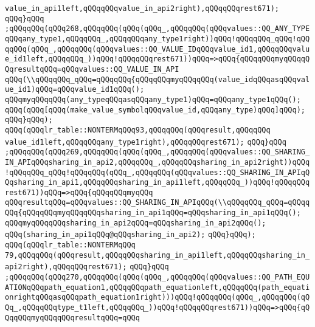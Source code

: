 \verb|value_in_api1left,qQQqqQQqvalue_in_api2right),qQQqqQQqrest671);|\newline
\verb|qQQq}qQQq|\newline
\verb|;qQQqqQQq(qQQq268,qQQqqQQq(qQQq(qQQq_,qQQqqQQq(qQQqvalues::QQ_ANY_TYPEqQQqany_type1,qQQqqQQq_,qQQqqQQqany_type1right))qQQq!qQQqqQQq_qQQq!qQQqqQQq(qQQq_,qQQqqQQq(qQQqvalues::QQ_VALUE_IDqQQqvalue_id1,qQQqqQQqvalue_id1left,qQQqqQQq_))qQQq!qQQqqQQqrest671))qQQq=>qQQq{qQQqqQQqmyqQQqqQQqresultqQQq=qQQqvalues::QQ_VALUE_IN_API|\newline
\verb|qQQq(\\qQQqqQQq_qQQq=qQQqqQQq{qQQqqQQqmyqQQqqQQq(value_idqQQqasqQQqvalue_id1)qQQq=qQQqvalue_id1qQQq();|\newline
\verb|qQQqmyqQQqqQQq(any_typeqQQqasqQQqany_type1)qQQq=qQQqany_type1qQQq();|\newline
\verb|qQQq(qQQq[qQQq(make_value_symbolqQQqvalue_id,qQQqany_type)qQQq]qQQq);|\newline
\verb|qQQq}qQQq);|\newline
\verb|qQQq(qQQqlr_table::NONTERMqQQq93,qQQqqQQq(qQQqresult,qQQqqQQq|\newline
\verb|value_id1left,qQQqqQQqany_type1right),qQQqqQQqrest671);|\newline
\verb|qQQq}qQQq|\newline
\verb|;qQQqqQQq(qQQq269,qQQqqQQq(qQQq(qQQq_,qQQqqQQq(qQQqvalues::QQ_SHARING_IN_APIqQQqsharing_in_api2,qQQqqQQq_,qQQqqQQqsharing_in_api2right))qQQq!qQQqqQQq_qQQq!qQQqqQQq(qQQq_,qQQqqQQq(qQQqvalues::QQ_SHARING_IN_APIqQQqsharing_in_api1,qQQqqQQqsharing_in_api1left,qQQqqQQq_))qQQq!qQQqqQQqrest671))qQQq=>qQQq{qQQqqQQqmyqQQq|\newline
\verb|qQQqresultqQQq=qQQqvalues::QQ_SHARING_IN_APIqQQq(\\qQQqqQQq_qQQq=qQQqqQQq{qQQqqQQqmyqQQqqQQqsharing_in_api1qQQq=qQQqsharing_in_api1qQQq();|\newline
\verb|qQQqmyqQQqqQQqsharing_in_api2qQQq=qQQqsharing_in_api2qQQq();|\newline
\verb|qQQq(sharing_in_api1qQQq@qQQqsharing_in_api2);|\newline
\verb|qQQq}qQQq);|\newline
\verb|qQQq(qQQqlr_table::NONTERMqQQq|\newline
\verb|79,qQQqqQQq(qQQqresult,qQQqqQQqsharing_in_api1left,qQQqqQQqsharing_in_api2right),qQQqqQQqrest671);|\newline
\verb|qQQq}qQQq|\newline
\verb|;qQQqqQQq(qQQq270,qQQqqQQq(qQQq(qQQq_,qQQqqQQq(qQQqvalues::QQ_PATH_EQUATIONqQQqpath_equation1,qQQqqQQqpath_equationleft,qQQqqQQq(path_equationrightqQQqasqQQqpath_equation1right)))qQQq!qQQqqQQq(qQQq_,qQQqqQQq(qQQq_,qQQqqQQqtype_t1left,qQQqqQQq_))qQQq!qQQqqQQqrest671))qQQq=>qQQq{qQQqqQQqmyqQQqqQQqresultqQQq=qQQq|\newline
